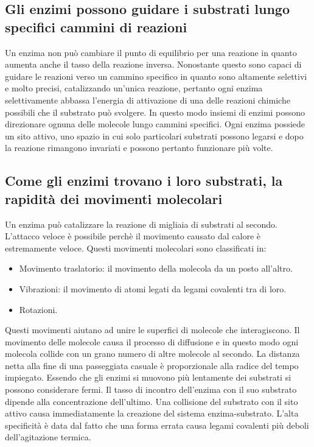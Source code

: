 \subsection{Gli enzimi possono guidare i substrati lungo specifici cammini di reazioni}
Un enzima non pu\`o cambiare il punto di equilibrio per una reazione in quanto aumenta anche il tasso della reazione inversa. Nonostante questo sono capaci di guidare le reazioni verso
un cammino specifico in quanto sono altamente selettivi e molto precisi, catalizzando un'unica reazione, pertanto ogni enzima selettivamente abbassa l'energia di attivazione di una delle
reazioni chimiche possibili  che il substrato pu\`o svolgere. In questo modo insiemi di enzimi possono direzionare ognuna delle molecole lungo cammini specifici. Ogni enzima possiede un
sito attivo, uno spazio in cui solo particolari substrati possono legarsi e dopo la reazione rimangono invariati e possono pertanto funzionare pi\`u volte. 
\subsection{Come gli enzimi trovano i loro substrati, la rapidit\`a dei movimenti molecolari}
Un enzima pu\`o catalizzare la reazione di migliaia di substrati al secondo. L'attacco veloce \`e possibile perch\`e il movimento causato dal calore \`e estremamente veloce. Questi 
movimenti molecolari sono classificati in:
\begin{itemize}
	\item Movimento traslatorio: il movimento della molecola da un posto all'altro.
	\item Vibrazioni: il movimento di atomi legati da legami covalenti tra di loro.
	\item Rotazioni.
\end{itemize}
Questi movimenti aiutano ad unire le superfici di molecole che interagiscono. Il movimento delle molecole causa il processo di diffusione e in questo modo ogni molecola collide con un
grano numero di altre molecole al secondo. La distanza netta alla fine di una passeggiata casuale \`e proporzionale alla radice del tempo impiegato. Essendo che gli enzimi si muovono 
pi\`u lentamente dei substrati si possono considerare fermi. Il tasso di incontro dell'enzima con il suo substrato dipende alla concentrazione dell'ultimo. Una collisione del substrato 
con il sito attivo causa immediatamente la creazione del sistema enzima-substrato. L'alta specificit\`a \`e data dal fatto che una forma errata causa legami covalenti pi\`u deboli 
dell'agitazione termica. 
